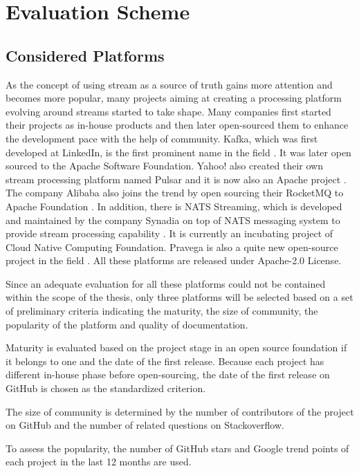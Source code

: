 \chapter{Evaluation Scheme} \label{chap:evaluation-scheme}

\section{Considered Platforms}
As the concept of using stream as a source of truth gains more attention and becomes more popular, many projects aiming at creating a processing platform evolving around streams started to take shape. 
Many companies first started their projects as in-house products and then later open-sourced them to enhance the development pace with the help of community. Kafka, which was first developed at LinkedIn, is the first prominent name in the field \cite{apachekafka}. It was later open sourced to the Apache Software Foundation. Yahoo! also created their own stream processing platform named Pulsar and it is now also an Apache project \cite{apachepulsar}. The company Alibaba also joins the trend by open sourcing their RocketMQ to Apache Foundation \cite{rocketmq}. In addition, there is NATS Streaming, which is developed and maintained by the company Synadia on top of NATS messaging system to provide stream processing capability \cite{natsstreaming}. It is currently an incubating project of Cloud Native Computing Foundation. Pravega is also a quite new open-source project in the field \cite{pravega}. All these platforms are released under Apache-2.0 License.

Since an adequate evaluation for all these platforms could not be contained within the scope of the thesis, only three platforms will be selected based on a set of preliminary criteria indicating the maturity, the size of community, the popularity of the platform and quality of documentation.

Maturity is evaluated based on the project stage in an open source foundation if it belongs to one and the date of the first release. Because each project has different in-house phase before open-sourcing, the date of the first release on GitHub is chosen as the standardized criterion.

The size of community is determined by the number of contributors of the project on GitHub and the number of related questions on Stackoverflow.

To assess the popularity, the number of GitHub stars and Google trend points of each project in the last 12 months are used.

